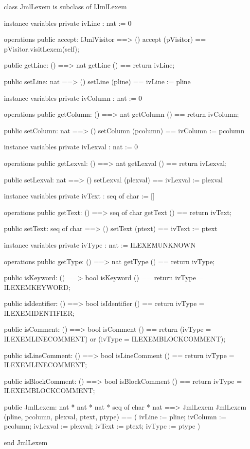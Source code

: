 \begin{vdm_al}
class JmlLexem is subclass of IJmlLexem

instance variables
  private ivLine : nat := 0

operations
  public accept: IJmlVisitor ==> ()
  accept (pVisitor) == pVisitor.visitLexem(self);

  public getLine: () ==> nat
  getLine () == return ivLine;

  public setLine: nat ==> ()
  setLine (pline) == ivLine := pline

instance variables
  private ivColumn : nat := 0

operations
  public getColumn: () ==> nat
  getColumn () == return ivColumn;

  public setColumn: nat ==> ()
  setColumn (pcolumn) == ivColumn := pcolumn

instance variables
  private ivLexval : nat := 0

operations
  public getLexval: () ==> nat
  getLexval () == return ivLexval;

  public setLexval: nat ==> ()
  setLexval (plexval) == ivLexval := plexval

instance variables
  private ivText : seq of char := []

operations
  public getText: () ==> seq of char
  getText () == return ivText;

  public setText: seq of char ==> ()
  setText (ptext) == ivText := ptext

instance variables
  private ivType : nat := ILEXEMUNKNOWN

operations
  public getType: () ==> nat
  getType () == return ivType;

  public isKeyword: () ==> bool
  isKeyword () == return ivType = ILEXEMKEYWORD;

  public isIdentifier: () ==> bool
  isIdentifier () == return ivType = ILEXEMIDENTIFIER;

  public isComment: () ==> bool
  isComment () == return (ivType = ILEXEMLINECOMMENT) or (ivType = ILEXEMBLOCKCOMMENT);

  public isLineComment: () ==> bool
  isLineComment () == return ivType = ILEXEMLINECOMMENT;

  public isBlockComment: () ==> bool
  isBlockComment () == return ivType = ILEXEMBLOCKCOMMENT;

  public JmlLexem: nat * nat * nat * seq of char * nat ==> JmlLexem
  JmlLexem (pline, pcolumn, plexval, ptext, ptype) ==
    ( ivLine := pline;
      ivColumn := pcolumn;
      ivLexval := plexval;
      ivText := ptext;
      ivType := ptype )

end JmlLexem
\end{vdm_al}
